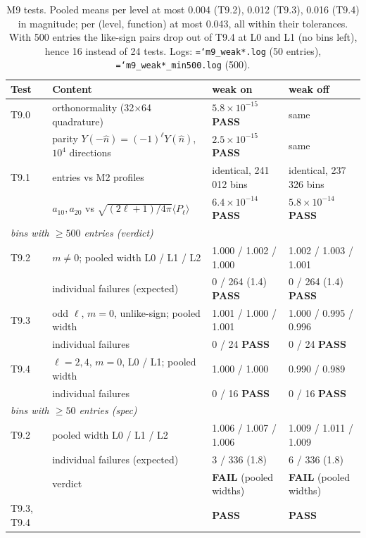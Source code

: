 \documentclass[11pt,a4paper]{article}
\newcommand{\pass}{\textcolor{green!45!black}{\textbf{PASS}}}
\newcommand{\fail}{\textcolor{red!70!black}{\textbf{FAIL}}}
\newcommand{\code}[1]{\texttt{\hyphenchar\font=`\-#1}}
\begin{document}
\begin{table}[H]
\centering
\small
\begin{tabular}{llll}
\toprule
Test & Content & weak on & weak off \\
\midrule
T9.0 & orthonormality (32$\times$64 quadrature) & $5.8\times10^{-15}$ \pass & same \\
     & parity $Y(-\hat n)=(-1)^\ell Y(\hat n)$, $10^4$ directions & $2.5\times10^{-15}$ \pass & same \\
T9.1 & entries vs M2 profiles & identical, 241\,012 bins & identical, 237\,326 bins \\
     & $a_{10},a_{20}$ vs $\sqrt{(2\ell+1)/4\pi}\langle P_\ell\rangle$ & $6.4\times10^{-14}$ \pass &
       $5.8\times10^{-14}$ \pass \\
\midrule
\multicolumn{4}{l}{\emph{bins with $\ge500$ entries (verdict)}} \\
T9.2 & $m\neq0$; pooled width L0 / L1 / L2 & 1.000 / 1.002 / 1.000 & 1.002 / 1.003 / 1.001 \\
     & individual failures (expected) & 0 / 264 (1.4) \pass & 0 / 264 (1.4) \pass \\
T9.3 & odd $\ell$, $m=0$, unlike-sign; pooled width & 1.001 / 1.000 / 1.001 & 1.000 / 0.995 / 0.996 \\
     & individual failures & 0 / 24 \pass & 0 / 24 \pass \\
T9.4 & $\ell=2,4$, $m=0$, L0 / L1; pooled width & 1.000 / 1.000 & 0.990 / 0.989 \\
     & individual failures & 0 / 16 \pass & 0 / 16 \pass \\
\midrule
\multicolumn{4}{l}{\emph{bins with $\ge50$ entries (spec)}} \\
T9.2 & pooled width L0 / L1 / L2 & 1.006 / 1.007 / 1.006 & 1.009 / 1.011 / 1.009 \\
     & individual failures (expected) & 3 / 336 (1.8) & 6 / 336 (1.8) \\
     & verdict & \fail{} (pooled widths) & \fail{} (pooled widths) \\
T9.3, T9.4 & & \pass & \pass \\
\bottomrule
\end{tabular}
\caption{M9 tests. Pooled means per level at most 0.004 (T9.2), 0.012 (T9.3), 0.016 (T9.4) in
magnitude; per (level, function) at most 0.043, all within their tolerances. With 500 entries the like-sign pairs drop out of T9.4 at L0
and L1 (no bins left), hence 16 instead of 24 tests. Logs: \code{m9\_weak*.log} (50 entries),
\code{m9\_weak*\_min500.log} (500).}
\end{table}
\end{document}
